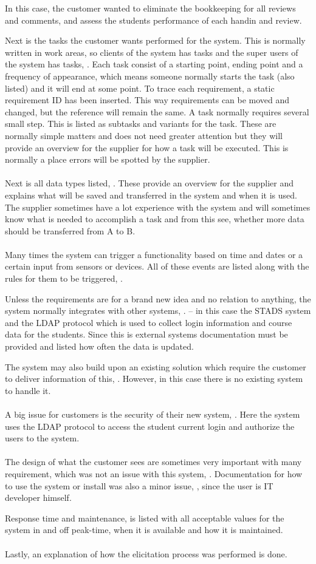 \documentclass[Main]{subfiles}
\begin{document}
In this case, the customer wanted to eliminate the bookkeeping for all reviews and comments, and assess the students performance of each handin and review.

Next is the tasks the customer wants performed for the system.
This is normally written in work areas, so clients of the system has tasks and the super users of the system has tasks, \parencite[8-13]{HI4}.
Each task consist of a starting point, ending point and a frequency of appearance, which means someone normally starts the task (also listed) and it will end at some point.
To trace each requirement, a static requirement ID has been inserted.
This way requirements can be moved and changed, but the reference will remain the same.
A task normally requires several small step.
This is listed as subtasks and variants for the task. 
These are normally simple matters and does not need greater attention but they will provide an overview for the supplier for how a task will be executed.
This is normally a place errors will be spotted by the supplier.
\\
\\
Next is all data types listed, \parencite[14-17]{HI4}.
These provide an overview for the supplier and explains what will be saved and transferred in the system and when it is used.
The supplier sometimes have a lot experience with the system and will sometimes know what is needed to accomplish a task and from this see, whether more data should be transferred from A to B.
\\
\\
Many times the system can trigger a functionality based on time and dates or a certain input from sensors or devices.
All of these events are listed along with the rules for them to be triggered, \parencite[18]{HI4}.

Unless the requirements are for a brand new idea and no relation to anything, the system normally integrates with other systems, \parencite[19-20]{HI4}. -- in this case the STADS system and the LDAP protocol which is used to collect login information and course data for the students. 
Since this is external systems documentation must be provided and listed how often the data is updated.

The system may also build upon an existing solution which require the customer to deliver information of this, \parencite[21]{HI4}.
However, in this case there is no existing system to handle it.
\\
\\
A big issue for customers is the security of their new system, \parencite[22]{HI4}.
Here the system uses the LDAP protocol to access the student current login and authorize the users to the system.
\\
\\
The design of what the customer sees are sometimes very important with many requirement, which was not an issue with this system, \parencite[23]{HI4}.
Documentation for how to use the system or install was also a minor issue, \parencite[24]{HI4}, since the user is IT developer himself.

Response time and maintenance, \parencite[25-27]{HI4} is listed with all acceptable values for the system in and off peak-time, when it is available and how it is maintained.
\\
\\
Lastly, an explanation of how the elicitation process was performed is done.
\end{document}
